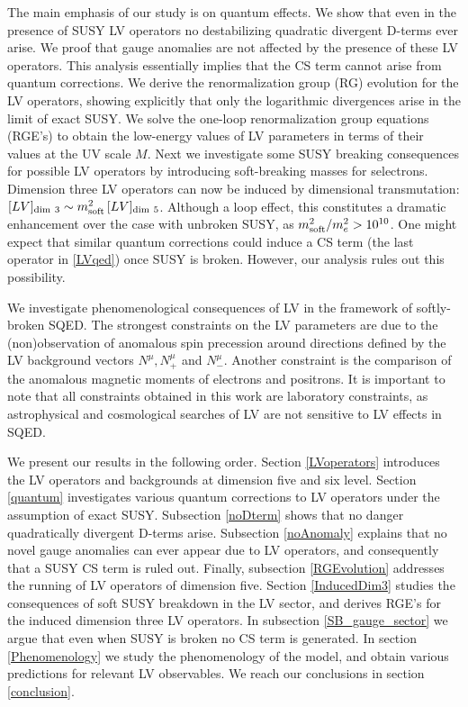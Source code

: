 \documentclass[12pt]{revtex4}
\begin{document}
The main emphasis of our study is on quantum effects. We show that
even in the presence of SUSY LV operators no destabilizing quadratic
divergent D-terms ever arise. We proof that gauge anomalies are
not affected by the presence of these LV operators. This analysis
essentially implies that the CS term cannot arise from quantum
corrections. We derive the renormalization group (RG) evolution for the
LV operators, showing explicitly that only the logarithmic divergences
arise in the limit of exact SUSY. We solve the one-loop
renormalization group equations (RGE's)  to obtain the low-energy
values of LV parameters in terms of their values at the UV scale
$M$. Next we investigate some SUSY breaking consequences for possible
LV operators by introducing soft-breaking masses for selectrons.
Dimension three LV operators can now be induced by dimensional
transmutation: 
$[LV]_{\rm dim~3} \sim m_{\rm soft}^2 \, [LV]_{\rm dim~5}$. 
Although a loop effect, this constitutes a dramatic enhancement over
the case with unbroken SUSY, as $ m_{\rm soft}^2/m_e^2 > 10^{10}$.  
One might expect that similar quantum corrections could induce a CS
term (the last operator in \eqref{LVqed}) once SUSY is
broken. However, our analysis rules out this possibility. 


We investigate phenomenological consequences of LV in the framework of
softly-broken SQED. The strongest constraints on the LV parameters are
due to the (non)observation of anomalous spin precession
around directions defined by the LV background vectors $N^\mu,
N_+^\mu$ and $N_-^\mu$. Another constraint is the
comparison of the anomalous magnetic moments of electrons and  
positrons. It is important to note that all constraints obtained in this 
work are laboratory constraints, as astrophysical and cosmological 
searches of LV are not sensitive to LV effects in SQED. 


We present our results in the following order. Section \ref{LVoperators} 
introduces the LV operators and backgrounds at dimension five and six
level. Section \ref{quantum} investigates various quantum corrections
to LV operators under the assumption of exact SUSY. Subsection
\ref{noDterm} shows that no danger quadratically divergent D-terms
arise. Subsection \ref{noAnomaly} explains that no novel gauge
anomalies can ever appear due to LV operators, and consequently that
a SUSY CS term is ruled out. Finally, subsection \ref{RGEvolution}
addresses the running of LV operators of dimension five. Section
\ref{InducedDim3} studies the consequences of soft SUSY breakdown in
the LV sector, and derives RGE's for the induced dimension three LV
operators. In subsection \ref{SB_gauge_sector} we argue that even when
SUSY is broken no CS term is generated. In section \ref{Phenomenology}
we study the phenomenology of the model, and obtain various
predictions for relevant LV observables.  We reach our conclusions in
section 
\ref{conclusion}.   
\end{document}
